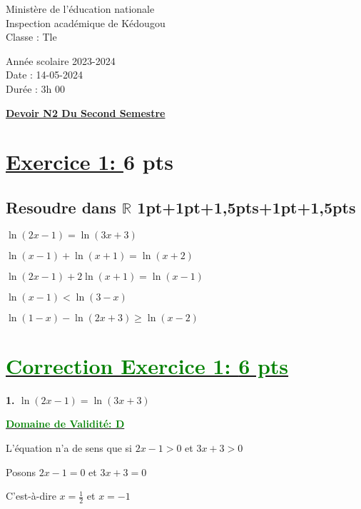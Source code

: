\documentclass[12pt]{article}
\begin{document}
\begin{minipage}{0.5\textwidth}
	Ministère de l'éducation nationale  \\
	Inspection académique de Kédougou   \\
	Classe : Tle  \\
\end{minipage}
\begin{minipage}{0.5\textwidth}
	Année scolaire 2023-2024 \\
	Date : 14-05-2024 \\
	Durée : 3h 00 \\
\end{minipage}

\begin{center}
	\textbf{{\underline{Devoir N2 Du Second Semestre}}}
\end{center}
\section*{\underline{Exercice 1: }\textbf{6 pts}}
\subsection*{ Resoudre dans $\mathbb{R}$ 1pt+1pt+1,5pts+1pt+1,5pts}
$\ln(2x-1)=\ln(3x+3)$

$\ln(x-1)+\ln(x+1)=\ln(x+2)$

$\ln(2x-1)+2\ln(x+1)=\ln(x-1)$

$\ln(x-1)<\ln(3-x)$

$\ln(1-x)-\ln(2x+3)\geq\ln(x-2)$
\section*{\underline{\textcolor{green}{Correction Exercice 1: \textbf{6 pts}}}}
\textbf{1. \(\ln(2x-1)=\ln(3x+3)\)}

\textbf{\underline{\textcolor{green}{Domaine de Validité: D}}}

L'équation n'a de sens que si $2x-1>0$ et $3x+3>0$

Posons $2x-1=0$ et $3x+3=0$

C'est-à-dire $x=\frac{1}{2}$ et $x=-1$
\end{document}

